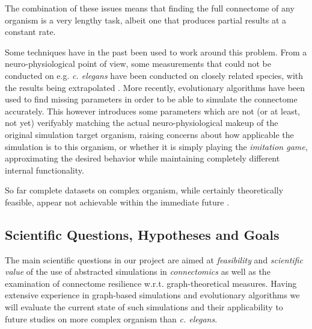 \documentclass[a4paper,11pt]{article}
\begin{document}
The combination of these issues means that finding the full connectome of any organism is a very lengthy task, albeit one that produces partial results at a constant rate. 

Some techniques have in the past been used to work around this problem. From a neuro-physiological point of view, some measurements that could not be conducted on e.g. \emph{c. elegans} have been conducted on closely related species, with the results being extrapolated \citep{ThatBlueBook}. More recently, evolutionary algorithms have been used to find missing parameters in order to be able to simulate the connectome accurately. This however introduces some parameters which are not (or at least, not yet) verifyably matching the actual neuro-physiological makeup of the original simulation target organism, raising concerns about how applicable the simulation is to this organism, or whether it is simply playing the \emph{imitation game}, approximating the desired behavior while maintaining completely different internal functionality.

So far complete datasets on complex organism, while certainly theoretically feasible, appear not achievable within the immediate future \citep{Gjorgjieva2014} \citep{Mikula2016}.


\subsection{Scientific Questions, Hypotheses and Goals}

The main scientific questions in our project are aimed at \emph{feasibility} and \emph{scientific value} of the use of abstracted simulations in \emph {connectomics} as well as the examination of connectome resilience w.r.t. graph-theoretical measures. Having extensive experience in graph-based simulations and evolutionary algorithms we will evaluate the current state of such simulations and their applicability to future studies on more complex organism than \emph{c. elegans}.
\end{document}
